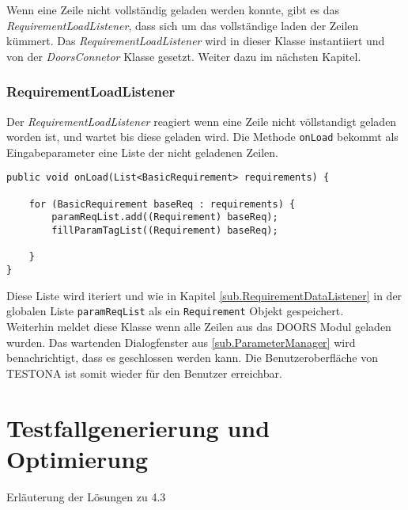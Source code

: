 Wenn eine Zeile nicht vollständig geladen werden konnte, gibt es das \textit{RequirementLoadListener}, dass sich um das vollständige laden der Zeilen kümmert. Das \textit{RequirementLoadListener} wird in dieser Klasse instantiiert und von der \textit{DoorsConnetor} Klasse gesetzt. Weiter dazu im nächsten Kapitel.


\subsubsection{RequirementLoadListener}\label{sub.RequirementLoadListener}
Der \textit{RequirementLoadListener} reagiert wenn eine Zeile nicht völlstandigt geladen worden ist, und wartet bis diese geladen wird. Die Methode \texttt{onLoad} bekommt als Eingabeparameter eine Liste der nicht geladenen Zeilen.

\begin{lstlisting}[caption={Nachladen der Parametertabelle nach Zeilen}, captionpos=b]
public void onLoad(List<BasicRequirement> requirements) {

	for (BasicRequirement baseReq : requirements) {
		paramReqList.add((Requirement) baseReq);
		fillParamTagList((Requirement) baseReq);
		
	}
}
\end{lstlisting}

Diese Liste wird iteriert und wie in Kapitel \ref{sub.RequirementDataListener} in der globalen Liste \texttt{paramReqList} als ein \texttt{Requirement} Objekt gespeichert.\\

Weiterhin meldet diese Klasse wenn alle Zeilen aus das DOORS Modul geladen wurden. Das wartenden Dialogfenster aus \ref{sub.ParameterManager} wird benachrichtigt, dass es geschlossen werden kann. Die Benutzeroberfläche von TESTONA ist somit wieder für den Benutzer erreichbar.


\newpage
\section{Testfallgenerierung und Optimierung}
\paragraph{}
Erläuterung der Lösungen zu 4.3